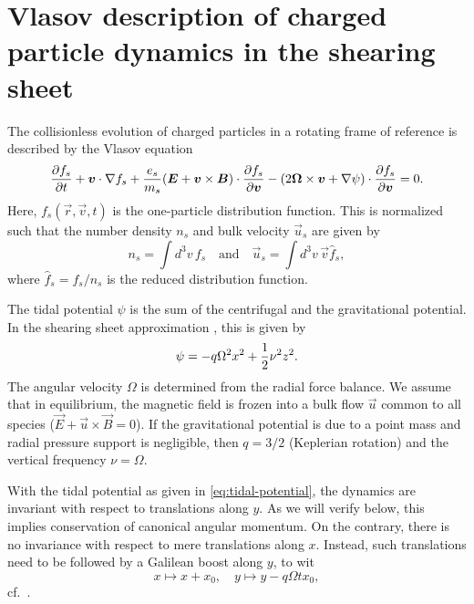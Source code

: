 \documentclass[aps,pre,notitlepage,amsmath,amssymb,amsfonts,nobibnotes,nofootinbib]{revtex4-1}
\begin{document}
\section{Vlasov description of charged particle dynamics in the shearing
sheet}
\label{sec:vlasov-sheet}

The collisionless evolution of charged particles in a rotating frame of
reference is described by the Vlasov equation
\begin{equation}
  \label{eq:vlasov-sheet}
  \pder{f_s}{t} + \vec{v}\cdot\nabla f_s
  + \frac{\qs}{m_s}(\vec{E} + \vec{v}\times\vec{B})\cdot\pder{f_s}{\vec{v}}
  - (2\vec{\Omega}\times\vec{v} + \nabla\psi)\cdot\pder{f_s}{\vec{v}} = 0.
\end{equation}
Here, $f_s(\vec{r},\vec{v},t)$ is the one-particle distribution function. This
is normalized such that the number density $n_s$ and bulk velocity $\vec{u}_s$
are given by
\begin{equation}
  \label{eq:moments}
  n_s = \int d^3v\,f_s
  \quad\textrm{and}\quad
  \vec{u}_s = \int d^3v\,\vec{v}\hat{f}_s,
\end{equation}
where $\hat{f}_s=f_s/n_s$ is the reduced distribution function.

The tidal potential $\psi$ is the sum of the centrifugal and the gravitational
potential. In the shearing sheet approximation \citep{Goldreich1965}, this is
given by
\begin{equation}
  \label{eq:tidal-potential}
  \psi = -q\Omega^2 x^2 + \frac{1}{2}\vfreq^2 z^2.
\end{equation}
The angular velocity $\Omega$ is determined from the radial force balance. We
assume that in equilibrium, the magnetic field is frozen into a bulk flow
$\vec{u}$ common to all species ($\vec{E}+\vec{u}\times\vec{B}=0$). If the
gravitational potential is due to a point mass and radial pressure support is
negligible, then $q=3/2$ (Keplerian rotation) and the vertical frequency
$\nu=\Omega$.

With the tidal potential as given in \cref{eq:tidal-potential}, the dynamics
are invariant with respect to translations along $y$. As we will verify below,
this implies conservation of canonical angular momentum. On the contrary,
there is no invariance with respect to mere translations along $x$. Instead,
such translations need to be followed by a Galilean boost along $y$, to wit
\begin{equation}
  \label{eq:shear-symmetry}
  x \mapsto x + x_0,\quad
  y \mapsto y - q\Omega t x_0,
\end{equation}
cf.~\citet{Wisdom1988}.
\end{document}
